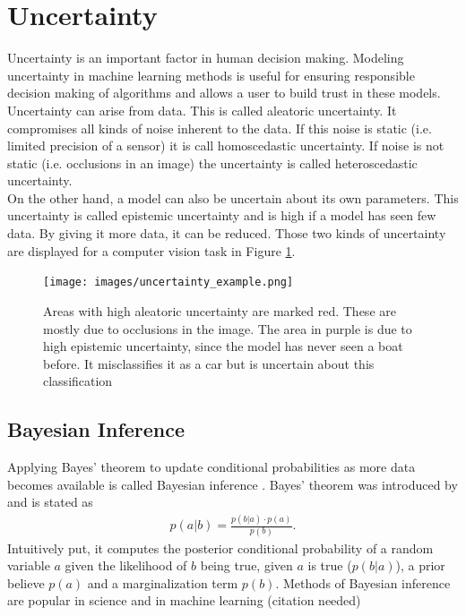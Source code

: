 \documentclass[a4paper,cleardoubleempty,BCOR1cm, 11pt]{report}
\begin{document}
\section{Uncertainty}
Uncertainty is an important factor in human decision making. Modeling uncertainty in machine learning methods is useful for ensuring responsible decision making of algorithms and allows a user to build trust in these models. Uncertainty can arise from data. This is called aleatoric uncertainty. It compromises all kinds of noise inherent to the data. If this noise is static (i.e. limited precision of a sensor) it is call homoscedastic uncertainty. If noise is not static (i.e. occlusions in an image) the uncertainty is called heteroscedastic uncertainty.\\
On the other hand, a model can also be uncertain about its own parameters. This uncertainty is called epistemic uncertainty and is high if a model has seen few data. By giving it more data, it can be reduced. Those two kinds of uncertainty are displayed for a computer vision task in Figure \ref{fig:uncertainty_example}.
\begin{figure}
	\centering
	\texttt{[image: images/uncertainty\_example.png]} 
	\caption{Areas with high aleatoric uncertainty are marked red. These are mostly due to occlusions in the image. The area in purple is due to high epistemic uncertainty, since the model has never seen a boat before. It misclassifies it as a car but is uncertain about this classification}
	\label{fig:uncertainty_example}
\end{figure}

\subsection{Bayesian Inference}
Applying Bayes' theorem to update conditional probabilities as more data becomes available is called Bayesian inference \cite{box2011bayesian}. Bayes' theorem was introduced by \citet{bayes1763lii} and is stated as
\begin{align*}
	p(a|b) = \frac{p(b|a) \cdot p(a)}{p(b)}.
\end{align*}
Intuitively put, it computes the posterior conditional probability of a random variable $a$ given the likelihood of $b$ being true, given $a$ is true ($p(b|a)$), a prior believe $p(a)$ and a marginalization term $p(b)$. Methods of Bayesian inference are popular in science and in machine learning (citation needed)
\end{document}
